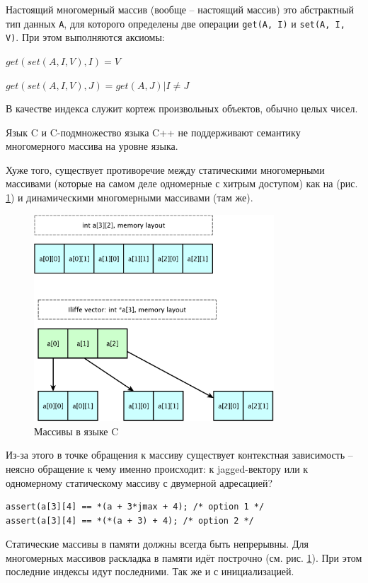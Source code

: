 \documentclass[a4paper,12pt,oneside]{article}
\begin{document}
Настоящий многомерный массив (вообще -- настоящий массив) это абстрактный тип данных \lstinline!A!, для которого определены две операции \lstinline!get(A, I)! и \lstinline!set(A, I, V)!. При этом выполняются аксиомы:

$get(set(A,I,V),I)=V$

$get(set(A,I,V),J)=get(A,J)|I \neq J$

В качестве индекса служит кортеж произвольных объектов, обычно целых чисел.

Язык C и C-подмножество языка C++ не поддерживают семантику многомерного массива на уровне языка.

Хуже того, существует противоречие между статическими многомерными массивами (которые на самом деле одномерные с хитрым доступом) как на (рис. \ref{fig:c_arrays}) и динамическими многомерными массивами (там же).

\begin{figure}[h!]
\centering
\includegraphics[width=0.8\textwidth]{illustrations/arraylayout-crop.pdf}
\caption{Массивы в языке C}
\label{fig:c_arrays}
\end{figure}

Из-за этого в точке обращения к массиву существует контекстная зависимость -- неясно обращение к чему именно происходит: к jagged-вектору или к одномерному статическому массиву с двумерной адресацией?

\begin{lstlisting}
assert(a[3][4] == *(a + 3*jmax + 4); /* option 1 */
assert(a[3][4] == *(*(a + 3) + 4); /* option 2 */
\end{lstlisting}

Статические массивы в памяти должны всегда быть непрерывны. Для многомерных массивов раскладка в памяти идёт построчно (см. рис. \ref{fig:c_arrays}). При этом последние индексы идут последними. Так же и с инициализацией.
\end{document}
